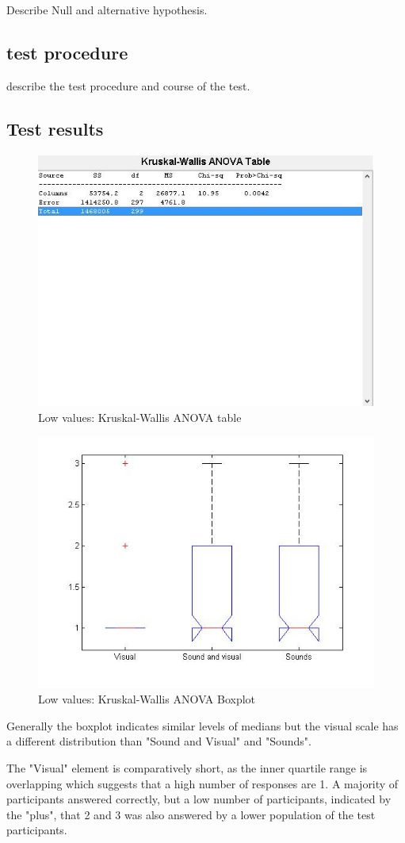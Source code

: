 Describe Null and alternative hypothesis.

\subsection{test procedure}

describe the test procedure and course of the test.

\subsection{Test results}

\begin{figure}[!htbp]
    \centering
    \includegraphics[width=.5\textwidth]{images/tableLow.jpg}
    \caption{Low values: Kruskal-Wallis ANOVA table}
    \label{fig:tableLow}
\end{figure}

\begin{figure}[!htbp]
    \centering
    \includegraphics[width=.5\textwidth]{images/boxplotLow.jpg}
    \caption{Low values: Kruskal-Wallis ANOVA Boxplot}
    \label{fig:boxplotLow}
\end{figure}

Generally the boxplot indicates similar levels of medians but the visual scale has a different distribution than "Sound and Visual" and "Sounds".

The "Visual" element is comparatively short, as the inner quartile range is overlapping which suggests that a high number of responses are 1. A majority of participants answered correctly, but a low number of participants, indicated by the "plus", that 2 and 3 was also answered by a lower population of the test participants.


